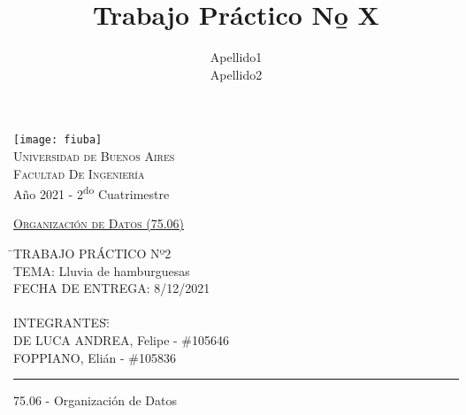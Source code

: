 \documentclass[12pt]{article}
\title{Trabajo Práctico N\b o X}
\author{Apellido1\\Apellido2}
\numberwithin{equation}{section}
\numberwithin{figure}{section}
\numberwithin{table}{section}
\begin{document}
	
	\pagestyle{fancy}
	\renewcommand{\sectionmark}[1]{\markboth{}{\thesection\ \ #1}}
	\lhead{}
	\chead{}
	\rhead{\rightmark}
	\lfoot{}
	\cfoot{}
	\rfoot{\thepage}
	
	\begin{titlepage}
		
		\thispagestyle{empty}
		
		\begin{center}
			\texttt{[image: fiuba]}\\
			\large{\textsc{Universidad de Buenos Aires}}\\
			\large{\textsc{Facultad De Ingeniería}}\\
			\small{Año 2021 - 2\textsuperscript{do} Cuatrimestre}
		\end{center}
		
		\vfill
		
		\begin{center}
			\Large{\underline{\textsc{Organización de Datos (75.06)}}}
		\end{center}
		
		\vfill
		
		\begin{tabbing}
			\hspace{2cm}\=\+TRABAJO PRÁCTICO Nº2\\
			TEMA: Lluvia de hamburguesas \\
			FECHA DE ENTREGA: 8/12/2021\\%
			\\
			INTEGRANTES:\hspace{-1cm}\=\+\hspace{1cm}\=\hspace{6cm}\=\\
			DE LUCA ANDREA, Felipe	\>\>- \#105646\\
			FOPPIANO, Elián	\>\>- \#105836\\
		\end{tabbing}
		
		\vfill
		
		\hrule
		\vspace{0.2cm}
		
		\noindent\small{75.06 - Organización de Datos}
		
	\end{titlepage}
	
	\setcounter{page}{1}
	
\end{document}
